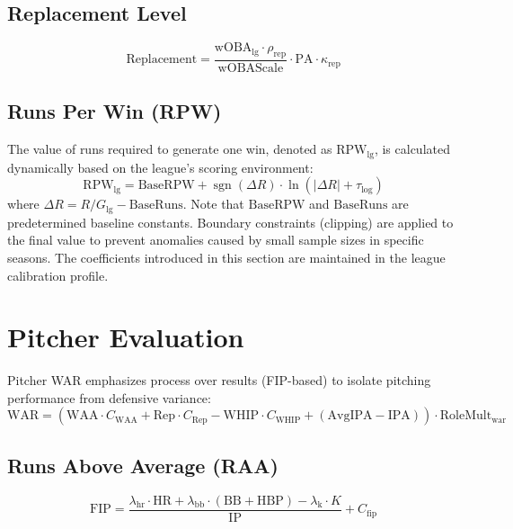 \documentclass[uplatex,a4paper,11pt,dvipdfmx]{jsarticle}
\newcommand{\mvar}[1]{\mathrm{#1}}
\begin{document}
\subsection{Replacement Level}
\begin{equation}
\mvar{Replacement} = \frac{\mvar{wOBA}_{\text{lg}} \cdot \rho_{\text{rep}}}{\mvar{wOBAScale}} \cdot \mvar{PA} \cdot \kappa_{\text{rep}}
\end{equation}

\subsection{Runs Per Win (RPW)}
The value of runs required to generate one win, denoted as $\mvar{RPW}_{\text{lg}}$, is calculated dynamically based on the league's scoring environment:
\begin{equation}
\mvar{RPW}_{\text{lg}} = \mvar{BaseRPW} + \operatorname{sgn}(\Delta R) \cdot \ln(|\Delta R| + \tau_{\log})
\end{equation}
where $\Delta R = R/G_{\text{lg}} - \mvar{BaseRuns}$. Note that $\mvar{BaseRPW}$ and $\mvar{BaseRuns}$ are predetermined baseline constants. Boundary constraints (clipping) are applied to the final value to prevent anomalies caused by small sample sizes in specific seasons. The coefficients introduced in this section are maintained in the league calibration profile.

\section{Pitcher Evaluation}
Pitcher WAR emphasizes process over results (FIP-based) to isolate pitching performance from defensive variance:
\begin{equation}
\mvar{WAR} = (\mvar{WAA} \cdot C_{\text{WAA}} + \mvar{Rep} \cdot C_{\text{Rep}} - \mvar{WHIP} \cdot C_{\text{WHIP}} + (\mvar{AvgIPA} - \mvar{IPA})) \cdot \mvar{RoleMult}_{\text{war}}
\end{equation}

\subsection{Runs Above Average (RAA)}
\begin{equation}
\mvar{FIP} = \frac{\lambda_{\text{hr}} \cdot \mvar{HR} + \lambda_{\text{bb}} \cdot (\mvar{BB} + \mvar{HBP}) - \lambda_{\text{k}} \cdot K}{\mvar{IP}} + C_{\text{fip}}
\end{equation}
\end{document}
